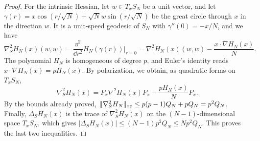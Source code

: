 \begin{proof}
For the intrinsic Hessian, let $w\in T_xS_N$ be a unit vector, and let $\gamma(r)=x\cos(r/\sqrt N)+\sqrt Nw\sin(r/\sqrt N)$ be the great circle through $x$ in the direction $w$. It is a unit-speed geodesic of $S_N$ with $\gamma''(0)=-x/N$, and we have
\[
 \nabla^2_SH_N(x)(w,w)=\frac{\dd^2}{\dd r^2}H_N(\gamma(r))\Big|_{r=0}
 =\nabla^2H_N(x)(w,w)-\frac{x\cdot\nabla H_N(x)}N.
\]
The polynomial $H_N$ is homogeneous of degree $p$, and Euler's identity reads $x\cdot\nabla H_N(x)=pH_N(x)$. By polarization, we obtain, as quadratic forms on $T_xS_N$,
\begin{equation}\label{eq:intrinsic-hessian}
 \nabla^2_SH_N(x)=P_x\nabla^2H_N(x)P_x-\frac{pH_N(x)}NP_x.
\end{equation}
By the bounds already proved, $\lVert\nabla^2_SH_N\rVert_{\mathrm{op}}\le p(p-1)Q_N+pQ_N=p^2Q_N$. Finally, $\Delta_SH_N(x)$ is the trace of $\nabla^2_SH_N(x)$ on the $(N-1)$-dimensional space $T_xS_N$, which gives $|\Delta_SH_N(x)|\le(N-1)p^2Q_N\le Np^2Q_N$. This proves the last two inequalities.
\end{proof}
